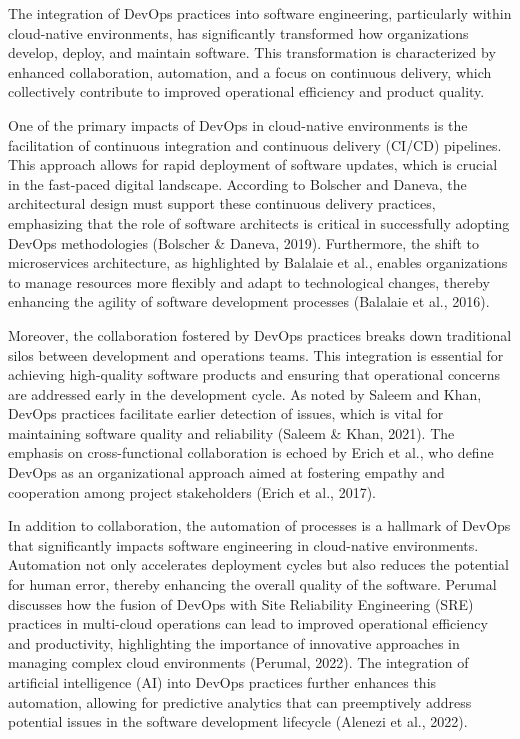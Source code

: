 The integration of DevOps practices into software engineering, particularly within cloud-native environments, has significantly transformed how organizations develop, deploy, and maintain software. This transformation is characterized by enhanced collaboration, automation, and a focus on continuous delivery, which collectively contribute to improved operational efficiency and product quality.

One of the primary impacts of DevOps in cloud-native environments is the facilitation of continuous integration and continuous delivery (CI/CD) pipelines. This approach allows for rapid deployment of software updates, which is crucial in the fast-paced digital landscape. According to Bolscher and Daneva, the architectural design must support these continuous delivery practices, emphasizing that the role of software architects is critical in successfully adopting DevOps methodologies (Bolscher & Daneva, 2019). Furthermore, the shift to microservices architecture, as highlighted by Balalaie et al., enables organizations to manage resources more flexibly and adapt to technological changes, thereby enhancing the agility of software development processes (Balalaie et al., 2016).

Moreover, the collaboration fostered by DevOps practices breaks down traditional silos between development and operations teams. This integration is essential for achieving high-quality software products and ensuring that operational concerns are addressed early in the development cycle. As noted by Saleem and Khan, DevOps practices facilitate earlier detection of issues, which is vital for maintaining software quality and reliability (Saleem & Khan, 2021). The emphasis on cross-functional collaboration is echoed by Erich et al., who define DevOps as an organizational approach aimed at fostering empathy and cooperation among project stakeholders (Erich et al., 2017).

In addition to collaboration, the automation of processes is a hallmark of DevOps that significantly impacts software engineering in cloud-native environments. Automation not only accelerates deployment cycles but also reduces the potential for human error, thereby enhancing the overall quality of the software. Perumal discusses how the fusion of DevOps with Site Reliability Engineering (SRE) practices in multi-cloud operations can lead to improved operational efficiency and productivity, highlighting the importance of innovative approaches in managing complex cloud environments (Perumal, 2022). The integration of artificial intelligence (AI) into DevOps practices further enhances this automation, allowing for predictive analytics that can preemptively address potential issues in the software development lifecycle (Alenezi et al., 2022).

